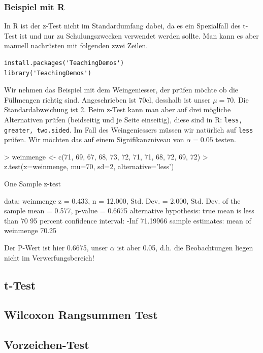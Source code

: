 \subsubsection{Beispiel mit R}
In R ist der z-Test nicht im Standardumfang dabei, da es ein Spezialfall 
des t-Test ist und nur zu Schulungszwecken verwendet werden sollte.
Man kann es aber manuell nachrüsten mit folgenden zwei Zeilen.\\
\begin{lstlisting}
install.packages('TeachingDemos')
library('TeachingDemos')
\end{lstlisting}

\noindent
Wir nehmen das Beispiel mit dem Weingeniesser, der prüfen möchte ob die 
Füllmengen richtig sind. Angeschrieben ist 70cl, desshalb ist unser
$\mu=70$. Die Standardabweichung ist 2. Beim z-Test kann man aber
auf drei mögliche Alternativen prüfen (beidseitig und je Seite einseitig), 
diese sind in R: \verb!less, greater, two.sided!. Im Fall des 
Weingeniessers müssen wir natürlich auf \verb!less! prüfen. 
Wir möchten das auf einem Signifikanzniveau von $\alpha=0.05$ testen.
\begin{Schunk}
\begin{Sinput}
> weinmenge <- c(71, 69, 67, 68, 73, 72, 71, 71, 68, 72, 69, 72)
> z.test(x=weinmenge, mu=70, sd=2, alternative='less')
\end{Sinput}
\begin{Soutput}
	One Sample z-test

data:  weinmenge
z = 0.433, n = 12.000, Std. Dev. = 2.000, Std. Dev. of the sample mean
= 0.577, p-value = 0.6675
alternative hypothesis: true mean is less than 70
95 percent confidence interval:
     -Inf 71.19966
sample estimates:
mean of weinmenge 
            70.25 
\end{Soutput}
\end{Schunk}

\noindent
Der P-Wert ist hier 0.6675, unser $\alpha$ ist aber 0.05, d.h. 
die Beobachtungen liegen nicht im Verwerfungsbereich!


\subsection{t-Test}
\subsection{Wilcoxon Rangsummen Test}
\subsection{Vorzeichen-Test}


